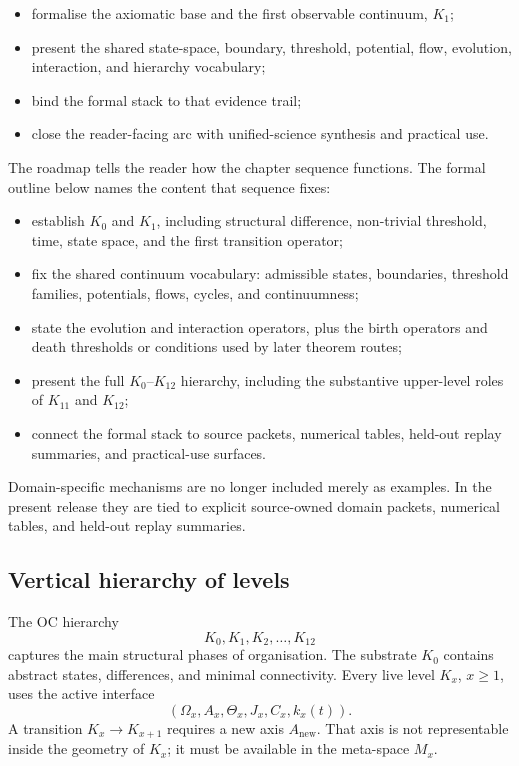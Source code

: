 \begin{itemize}
    \item formalise the axiomatic base and the first observable continuum,
          \(K_1\);
    \item present the shared state-space, boundary, threshold, potential, flow,
          evolution, interaction, and hierarchy vocabulary;
    \item bind the formal stack to that evidence trail;
    \item close the reader-facing arc with unified-science synthesis and
          practical use.
\end{itemize}

The roadmap tells the reader how the chapter sequence functions. The formal
outline below names the content that sequence fixes:

\begin{itemize}
    \item establish \(K_0\) and \(K_1\), including structural difference,
          non-trivial threshold, time, state space, and the first transition
          operator;
    \item fix the shared continuum vocabulary: admissible states, boundaries,
          threshold families, potentials, flows, cycles, and continuumness;
    \item state the evolution and interaction operators, plus the birth
          operators and death thresholds or conditions used by later theorem
          routes;
    \item present the full \(K_0\)–\(K_{12}\) hierarchy, including the
          substantive upper-level roles of \(K_{11}\) and \(K_{12}\);
    \item connect the formal stack to source packets, numerical tables,
          held-out replay summaries, and practical-use surfaces.
\end{itemize}

Domain-specific mechanisms are no longer included merely as examples. In the
present release they are tied to explicit source-owned domain packets,
numerical tables, and held-out replay summaries.

\subsection{Vertical hierarchy of levels}

The OC hierarchy
\[
K_0, K_1, K_2, \dots, K_{12}
\]
captures the main structural phases of organisation. The substrate \(K_0\)
contains abstract states, differences, and minimal connectivity. Every live
level \(K_x\), \(x\ge 1\), uses the active interface
\[
(\Omega_x,A_x,\Theta_x,J_x,C_x,k_x(t)).
\]
A transition \(K_x\to K_{x+1}\) requires a new axis
\(A_{\mathrm{new}}\). That axis is not representable inside the geometry of
\(K_x\); it must be available in the meta-space \(M_x\).

